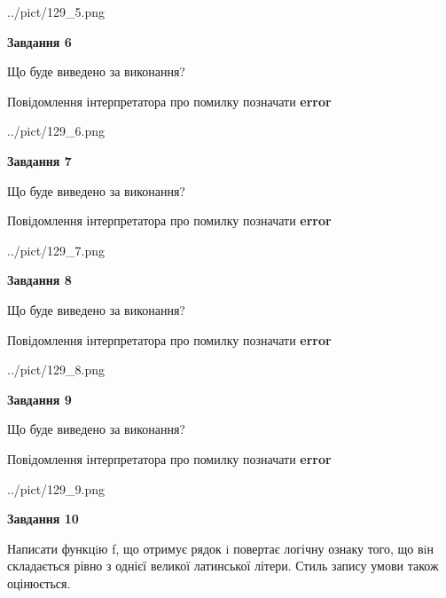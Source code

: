\documentclass[12pt, ukrainian]{article}
\begin{document}
{\begin {large}
\begin{center}
	{../pict/129_5.png}
\end{center}
\newpage

{\begin {center}\textbf{Завдання 6}\end {center}}\par
Що буде виведено за виконання? \par
Повідомлення інтерпретатора про помилку позначати \textbf{error}

\begin{center}
	{../pict/129_6.png}
\end{center}
\newpage

{\begin {center}\textbf{Завдання 7}\end {center}}\par
Що буде виведено за виконання? \par
Повідомлення інтерпретатора про помилку позначати \textbf{error}

\begin{center}
	{../pict/129_7.png}
\end{center}
\newpage

{\begin {center}\textbf{Завдання 8}\end {center}}\par
Що буде виведено за виконання? \par
Повідомлення інтерпретатора про помилку позначати \textbf{error}

\begin{center}
	{../pict/129_8.png}
\end{center}
\newpage

{\begin {center}\textbf{Завдання 9}\end {center}}\par
Що буде виведено за виконання? \par
Повідомлення інтерпретатора про помилку позначати \textbf{error}

\begin{center}
	{../pict/129_9.png}
\end{center}
\newpage

{\begin {center}\textbf{Завдання 10}\end {center}}\par

Написати функцiю f, що отримує рядок i повертає логічну ознаку того, що вiн складається рівно з однієї великої латинської літери. Стиль запису умови також оцінюється.\par
\newpage

\end {large}}
\end{document}
